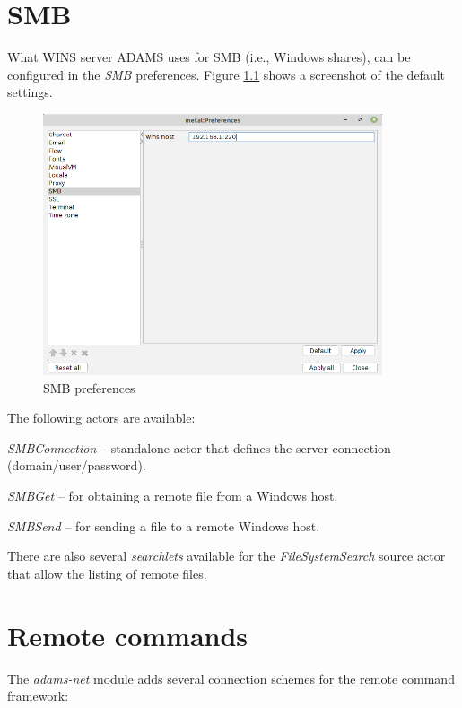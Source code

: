 \documentclass[a4paper]{book}
\begin{document}

\chapter{SMB}
What WINS server ADAMS uses for SMB (i.e., Windows shares), can be configured in the
\textit{SMB} preferences. Figure \ref{smb_setup} shows a screenshot of the
default settings.

\begin{figure}[htb]
  \centering
  \includegraphics[width=10.0cm]{images/smb_setup.png}
  \caption{SMB preferences}
  \label{smb_setup}
\end{figure}

The following actors are available:
\begin{tight_itemize}
	\item \textit{SMBConnection} -- standalone actor that defines the server
	connection (domain/user/password).
	\item \textit{SMBGet} -- for obtaining a remote file from a Windows host.
	\item \textit{SMBSend} -- for sending a file to a remote Windows host.
\end{tight_itemize}

There are also several \textit{searchlets} available for the
\textit{FileSystemSearch} source actor that allow the listing of remote
files.


\chapter{Remote commands}

The \textit{adams-net} module adds several connection schemes for the
remote command framework:
\end{document}
